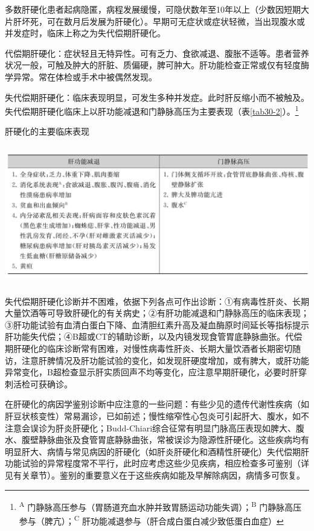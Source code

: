 多数肝硬化患者起病隐匿，病程发展缓慢，可隐伏数年至10年以上（少数因短期大片肝坏死，可在数月后发展为肝硬化）。早期可无症状或症状轻微，当出现腹水或并发症时，临床上称之为失代偿期肝硬化。

代偿期肝硬化：症状轻且无特异性。可有乏力、食欲减退、腹胀不适等。患者营养状况一般，可触及肿大的肝脏、质偏硬，脾可肿大。肝功能检查正常或仅有轻度酶学异常。常在体检或手术中被偶然发现。

失代偿期肝硬化：临床表现明显，可发生多种并发症。此时肝反缩小而不被触及。失代偿期肝硬化临床上以肝功能减退和门静脉高压为主要表现（表\ref{tab30-2}）。\footnote{\textsuperscript{A}
门静脉高压参与（胃肠道充血水肿并致胃肠运动功能失调）；\textsuperscript{B}
门静脉高压参与（脾亢）；\textsuperscript{C}
肝功能减退参与（肝合成白蛋白减少致低蛋白血症）}

\begin{table}[htbp]
\centering
\caption{肝硬化的主要临床表现}
\label{tab30-2}
\includegraphics[width=5.90625in,height=2.38542in]{./images/Image00158.jpg}
\end{table}

失代偿期肝硬化诊断并不困难，依据下列各点可作出诊断：①有病毒性肝炎、长期大量饮酒等可导致肝硬化的有关病史；②有肝功能减退和门静脉高压的临床表现；③肝功能试验有血清白蛋白下降、血清胆红素升高及凝血酶原时间延长等指标提示肝功能失代偿；④B超或CT的辅助诊断，以及内镜发现食管胃底静脉曲张。代偿期肝硬化的临床诊断常有困难，对慢性病毒性肝炎、长期大量饮酒者长期密切随访，注意肝脾情况及肝功能试验的变化，如发现肝硬度增加，或有脾大，或肝功能异常变化，B超检查显示肝实质回声不均等变化，应注意早期肝硬化，必要时肝穿刺活检可获确诊。

在肝硬化的病因学鉴别诊断中应注意的一些问题：有些少见的遗传代谢性疾病（如肝豆状核变性）常易漏诊，已如前述；慢性缩窄性心包炎可引起肝大、腹水，如不注意会误诊为肝炎肝硬化；Budd-Chiari综合征常有明显门脉高压表现如脾大、腹水、腹壁静脉曲张及食管胃底静脉曲张，常被误诊为隐源性肝硬化。这些疾病均有明显肝大、病情与常见病因的肝硬化（如肝炎肝硬化和酒精性肝硬化）失代偿期肝功能试验的异常程度常不平行，此时应考虑这些少见疾病，相应检查多可鉴别（详见有关章节）。鉴别的重要意义在于这些疾病如能及早解除病因，病情多可恢复。

